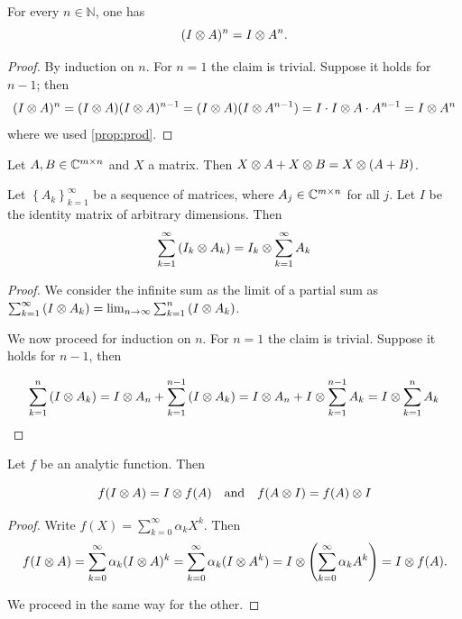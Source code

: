 \begin{lemma}
    For every $n \in \mathbb{N}$, one has
    \[
        (I \otimes A)^n = I \otimes A^n.
    \]
\end{lemma}

\begin{proof}
    By induction on $n$. For $n=1$ the claim is trivial. Suppose it holds for $n-1$; then
    \[
        (I \otimes A)^{n} = (I \otimes A)(I \otimes A)^{n-1} =(I \otimes A)(I \otimes A^{n-1}) = I \cdot I \otimes A \cdot A^{n-1} = I \otimes A^{n}
    \]
    where we used \ref{prop:prod}.
\end{proof}

\begin{lemma}
    Let $A,B \in \mathbb{C}^{m \times n}$ and $X$ a matrix. Then $X \otimes A + X \otimes B = X \otimes (A + B)$.
\end{lemma}

\begin{proposition}
    Let $\left\{A_k\right\}_{k = 1}^\infty$ be a sequence of matrices, where $A_j \in \mathbb{C}^{m \times n}$ for all $j$. Let $I$ be the identity matrix of arbitrary dimensions. Then 
    \[ \sum_{k = 1}^\infty \left(I_k \otimes A_k\right) = I_k \otimes \sum_{k = 1}^\infty A_k \]
\end{proposition}

\begin{proof}
    We consider the infinite sum as the limit of a partial sum as $\sum_{k = 1}^\infty \left(I \otimes A_k\right) = \lim_{n \to \infty} \sum_{k = 1}^n \left(I \otimes A_k\right)$.

    We now proceed for induction on $n$. For $n = 1$ the claim is trivial. Suppose it holds for $n-1$, then 

    \[
        \sum_{k = 1}^n \left(I \otimes A_k\right) = I \otimes A_n + \sum_{k = 1}^{n-1} \left(I \otimes A_k\right) = I \otimes A_n + I \otimes \sum_{k = 1}^{n-1} A_k = I \otimes \sum_{k = 1}^n A_k
    \]
\end{proof}

\begin{theorem}
    Let $f$ be an analytic function. Then

    \[
        f(I \otimes A) = I \otimes f(A) \quad \text{and} \quad f(A \otimes I) = f(A) \otimes I
    \]

    \label{th:analytic}
\end{theorem}

\begin{proof}
    Write $f(X) = \sum_{k=0}^\infty \alpha_k X^k$. Then
    \[
        f(I \otimes A) = \sum_{k=0}^\infty \alpha_k (I \otimes A)^k
        = \sum_{k=0}^\infty \alpha_k (I \otimes A^k)
        = I \otimes \left(\sum_{k=0}^\infty \alpha_k A^k\right)
        = I \otimes f(A).
    \]

    We proceed in the same way for the other.
\end{proof}


